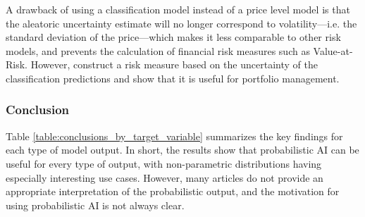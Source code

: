 A drawback of using a classification model instead of a price level model is that the aleatoric uncertainty estimate will no longer correspond to volatility—i.e. the standard deviation of the price—which makes it less comparable to other risk models, and prevents the calculation of financial risk measures such as Value-at-Risk. However, \textcite{kim2023portfolio} construct a risk measure based on the uncertainty of the classification predictions and show that it is useful for portfolio management.


\subsubsection{Conclusion} %
Table \ref{table:conclusions_by_target_variable} summarizes the key findings for each type of model output. In short, the results show that probabilistic AI can be useful for every type of output, with non-parametric distributions having especially interesting use cases. However, many articles do not provide an appropriate interpretation of the probabilistic output, and the motivation for using probabilistic AI is not always clear.


